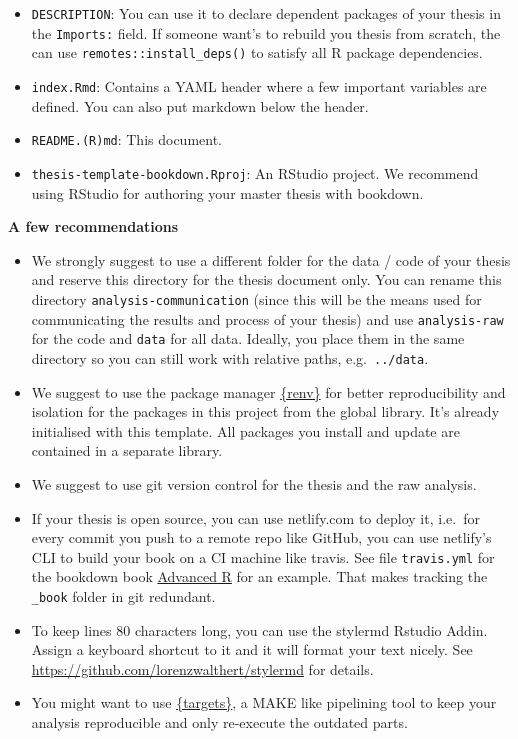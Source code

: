 \documentclass[11pt,a4paper,twoside,openright]{report}
\theoremstyle{definition}
\numberwithin{equation}{subsection}
\providecommand{\tightlist}{%
  \setlength{\itemsep}{0pt}\setlength{\parskip}{0pt}}
\begin{document}
\begin{itemize}
\tightlist
\item
  \texttt{DESCRIPTION}: You can use it to declare dependent packages of your thesis in
  the \texttt{Imports:} field. If someone want's to rebuild you thesis from scratch, the
  can use \texttt{remotes::install\_deps()} to satisfy all R package dependencies.
\item
  \texttt{index.Rmd}: Contains a YAML header where a few important variables are
  defined. You can also put markdown below the header.
\item
  \texttt{README.(R)md}: This document.
\item
  \texttt{thesis-template-bookdown.Rproj}: An RStudio project. We recommend using
  RStudio for authoring your master thesis with bookdown.
\end{itemize}

\textbf{A few recommendations}

\begin{itemize}
\tightlist
\item
  We strongly suggest to use a different folder for the data / code of your
  thesis and reserve this directory for the thesis document only. You can rename
  this directory \texttt{analysis-communication} (since this will be the means used for
  communicating the results and process of your thesis) and use \texttt{analysis-raw} for
  the code and \texttt{data} for all data. Ideally, you place them in the same directory
  so you can still work with relative paths, e.g.~\texttt{../data}.
\item
  We suggest to use the package manager \href{https://rstudio.github.io/renv/}{\{renv\}}
  for better reproducibility and isolation for the packages in this project from
  the global library. It's already initialised with this template. All packages
  you install and update are contained in a separate library.
\item
  We suggest to use git version control for the thesis and the raw analysis.
\item
  If your thesis is open source, you can use netlify.com to deploy it, i.e.~for
  every commit you push to a remote repo like GitHub, you can use netlify's CLI to
  build your book on a CI machine like travis. See file \texttt{travis.yml} for the
  bookdown book \href{https://github.com/hadley/adv-r/tree/88dcb07e2b2ae634af6cdeafff2f3ea976077064}{Advanced
  R}
  for an example. That makes tracking the \texttt{\_book} folder in git redundant.
\item
  To keep lines 80 characters long, you can use the stylermd Rstudio Addin.
  Assign a keyboard shortcut to it and it will format your text nicely.
  See \url{https://github.com/lorenzwalthert/stylermd} for details.
\item
  You might want to use \href{https://docs.ropensci.org/targets/}{\{targets\}}, a MAKE
  like pipelining tool to keep your analysis reproducible and only re-execute
  the outdated parts.
\end{itemize}
\end{document}
